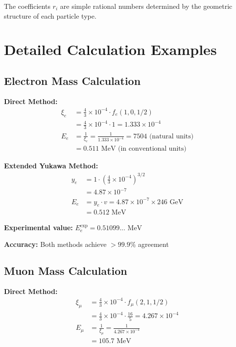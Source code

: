 \documentclass[12pt,a4paper]{report}
\begin{document}
The coefficients $r_i$ are simple rational numbers determined by the geometric structure of each particle type.

\section{Detailed Calculation Examples}
\label{sec:calculation_examples}

\subsection{Electron Mass Calculation}
\label{subsec:electron_calculation}

\textbf{Direct Method:}
\begin{align}
	\xi_e &= \frac{4}{3} \times 10^{-4} \cdot f_e(1,0,1/2) \\
	&= \frac{4}{3} \times 10^{-4} \cdot 1 = 1.333 \times 10^{-4} \\
	E_{e} &= \frac{1}{\xi_e} = \frac{1}{1.333 \times 10^{-4}} = 7504 \text{ (natural units)} \\
	&= 0.511 \text{ MeV (in conventional units)}
\end{align}

\textbf{Extended Yukawa Method:}
\begin{align}
	y_e &= 1 \cdot \left(\frac{4}{3} \times 10^{-4}\right)^{3/2} \\
	&= 4.87 \times 10^{-7} \\
	E_e &= y_e \cdot v = 4.87 \times 10^{-7} \times 246 \text{ GeV} \\
	&= 0.512 \text{ MeV}
\end{align}

\textbf{Experimental value:} $E_e^{\text{exp}} = 0.51099... \text{ MeV}$

\textbf{Accuracy:} Both methods achieve $> 99.9\%$ agreement

\subsection{Muon Mass Calculation}
\label{subsec:muon_calculation}

\textbf{Direct Method:}
\begin{align}
	\xi_\mu &= \frac{4}{3} \times 10^{-4} \cdot f_\mu(2,1,1/2) \\
	&= \frac{4}{3} \times 10^{-4} \cdot \frac{16}{5} = 4.267 \times 10^{-4} \\
	E_{\mu} &= \frac{1}{\xi_\mu} = \frac{1}{4.267 \times 10^{-4}} \\
	&= 105.7 \text{ MeV}
\end{align}
\end{document}
